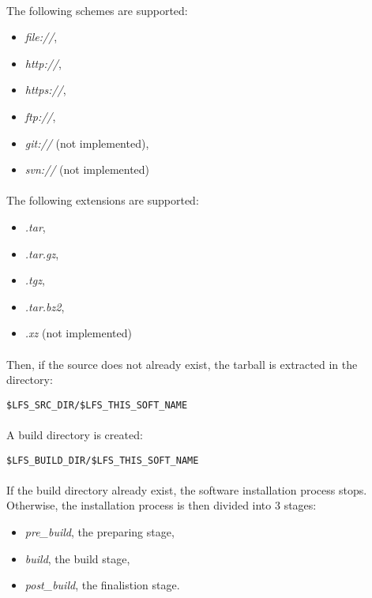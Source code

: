 \documentclass[a4paper, 11pt]{article}
\begin{document}
\paragraph{}
The following schemes are supported:
\begin{itemize}
\item \textit{file://},
\item \textit{http://},
\item \textit{https://},
\item \textit{ftp://},
\item \textit{git://} (not implemented),
\item \textit{svn://} (not implemented)
\end{itemize}

\paragraph{}
The following extensions are supported:
\begin{itemize}
\item \textit{.tar},
\item \textit{.tar.gz},
\item \textit{.tgz},
\item \textit{.tar.bz2},
\item \textit{.xz} (not implemented)
\end{itemize}

\paragraph{}
Then, if the source does not already exist, the tarball is extracted in the
directory:\\

\begin{lstlisting}[frame=tb]
$LFS_SRC_DIR/$LFS_THIS_SOFT_NAME
\end{lstlisting}

\paragraph{}
A build directory is created:\\
\begin{lstlisting}[frame=tb]
$LFS_BUILD_DIR/$LFS_THIS_SOFT_NAME
\end{lstlisting}

\paragraph{}
If the build directory already exist, the software installation process stops.
Otherwise, the installation process is then divided into 3 stages:
\begin{itemize}
\item \textit{pre\_build}, the preparing stage,
\item \textit{build}, the build stage,
\item \textit{post\_build}, the finalistion stage.
\end{itemize}
\end{document}
